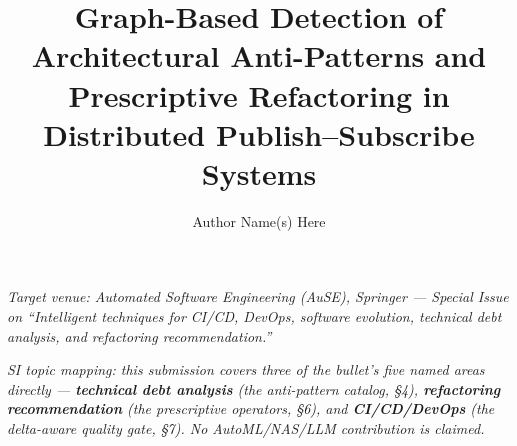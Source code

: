 \documentclass[11pt]{article}
\title{Graph-Based Detection of Architectural Anti-Patterns and Prescriptive Refactoring in
Distributed Publish--Subscribe Systems}
\author{Author Name(s) Here}
\date{}
\begin{document}
\maketitle

\begin{center}
\emph{Target venue: Automated Software Engineering (AuSE), Springer --- Special Issue on
``Intelligent techniques for CI/CD, DevOps, software evolution, technical debt analysis, and
refactoring recommendation.''}

\emph{SI topic mapping: this submission covers three of the bullet's five named areas directly ---
\textbf{technical debt analysis} (the anti-pattern catalog, \S4), \textbf{refactoring recommendation}
(the prescriptive operators, \S6), and \textbf{CI/CD/DevOps} (the delta-aware quality gate, \S7). No
AutoML/NAS/LLM contribution is claimed.}
\end{center}
\end{document}
